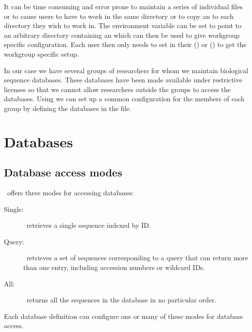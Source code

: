 \documentclass{report}
\begin{document}
It can be time consuming and error prone to maintain a series of
individual  files or to cause users to have to
work in the same directory or to copy an  to each
directory they wish to work in.  The environment variable
 can be set to point to an arbitrary directory
containing an  which can then be used to give
workgroup specific configuration. Each user then only needs to set
 in their  () or
 () to get the workgroup specific
setup.

In our case we have several groups of researchers for whom we maintain
biological sequence databases. These databases have been made
available under restrictive licenses so that we cannot allow
researchers outside the groups to access the databases. Using
 we can set up a common configuration for the
members of each group by defining the databases in the
 file.


\section{Databases}

\subsection{Database access modes}

\EMBOSS\ offers three modes for accessing databases:
\begin{description}

       \item[Single:]\EMBOSS\ retrieves a single sequence indexed by
       ID.

       \item[Query:]\EMBOSS\ retrieves a set of sequences
       corresponding to a query that can return more than one entry,
       including accession numbers or wildcard IDs.

       \item[All:]\EMBOSS\ returns all the sequences in the database
       in no particular order.

\end{description}

Each database definition can configure one or many of these modes for
database access.
\end{document}
